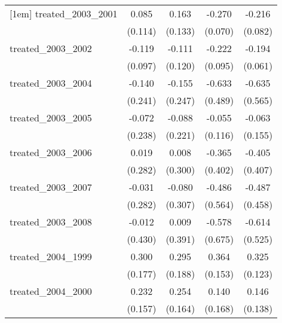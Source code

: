 {\begin{tabular}{l*{4}{c}}
[1em]
treated\_2003\_2001&       0.085         &       0.163         &      -0.270\sym{***}&      -0.216\sym{**} \\
            &     (0.114)         &     (0.133)         &     (0.070)         &     (0.082)         \\
[1em]
treated\_2003\_2002&      -0.119         &      -0.111         &      -0.222\sym{*}  &      -0.194\sym{**} \\
            &     (0.097)         &     (0.120)         &     (0.095)         &     (0.061)         \\
[1em]
treated\_2003\_2004&      -0.140         &      -0.155         &      -0.633         &      -0.635         \\
            &     (0.241)         &     (0.247)         &     (0.489)         &     (0.565)         \\
[1em]
treated\_2003\_2005&      -0.072         &      -0.088         &      -0.055         &      -0.063         \\
            &     (0.238)         &     (0.221)         &     (0.116)         &     (0.155)         \\
[1em]
treated\_2003\_2006&       0.019         &       0.008         &      -0.365         &      -0.405         \\
            &     (0.282)         &     (0.300)         &     (0.402)         &     (0.407)         \\
[1em]
treated\_2003\_2007&      -0.031         &      -0.080         &      -0.486         &      -0.487         \\
            &     (0.282)         &     (0.307)         &     (0.564)         &     (0.458)         \\
[1em]
treated\_2003\_2008&      -0.012         &       0.009         &      -0.578         &      -0.614         \\
            &     (0.430)         &     (0.391)         &     (0.675)         &     (0.525)         \\
[1em]
treated\_2004\_1999&       0.300         &       0.295         &       0.364\sym{*}  &       0.325\sym{**} \\
            &     (0.177)         &     (0.188)         &     (0.153)         &     (0.123)         \\
[1em]
treated\_2004\_2000&       0.232         &       0.254         &       0.140         &       0.146         \\
            &     (0.157)         &     (0.164)         &     (0.168)         &     (0.138)         \\

\end{tabular}}
